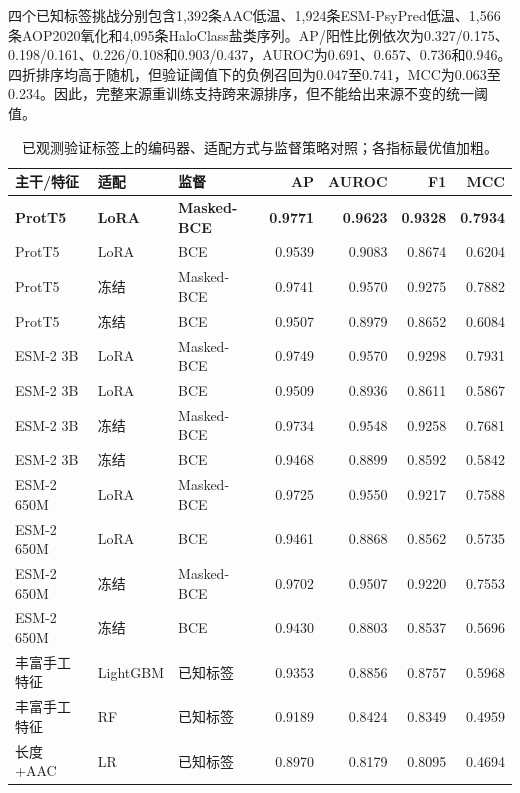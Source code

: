 \documentclass[conference]{IEEEtran}
\begin{document}
四个已知标签挑战分别包含1,392条AAC低温、1,924条ESM-PsyPred低温、1,566条AOP2020氧化和4,095条HaloClass盐类序列。AP/阳性比例依次为0.327/0.175、0.198/0.161、0.226/0.108和0.903/0.437，AUROC为0.691、0.657、0.736和0.946。四折排序均高于随机，但验证阈值下的负例召回为0.047至0.741，MCC为0.063至0.234。因此，完整来源重训练支持跨来源排序，但不能给出来源不变的统一阈值。

\begin{table}[t]
\centering
\caption{已观测验证标签上的编码器、适配方式与监督策略对照；各指标最优值加粗。}
\label{tab:2}
\footnotesize
\setlength{\tabcolsep}{3pt}
\begin{tabularx}{\textwidth}{@{}Xllrrrr@{}}
\toprule
主干/特征 & 适配 & 监督 & AP & AUROC & F1 & MCC \\
\midrule
\textbf{ProtT5} & \textbf{LoRA} & \textbf{Masked-BCE} & \textbf{0.9771} & \textbf{0.9623} & \textbf{0.9328} & \textbf{0.7934} \\
ProtT5 & LoRA & BCE & 0.9539 & 0.9083 & 0.8674 & 0.6204 \\
ProtT5 & 冻结 & Masked-BCE & 0.9741 & 0.9570 & 0.9275 & 0.7882 \\
ProtT5 & 冻结 & BCE & 0.9507 & 0.8979 & 0.8652 & 0.6084 \\
\midrule
ESM-2 3B & LoRA & Masked-BCE & 0.9749 & 0.9570 & 0.9298 & 0.7931 \\
ESM-2 3B & LoRA & BCE & 0.9509 & 0.8936 & 0.8611 & 0.5867 \\
ESM-2 3B & 冻结 & Masked-BCE & 0.9734 & 0.9548 & 0.9258 & 0.7681 \\
ESM-2 3B & 冻结 & BCE & 0.9468 & 0.8899 & 0.8592 & 0.5842 \\
\midrule
ESM-2 650M & LoRA & Masked-BCE & 0.9725 & 0.9550 & 0.9217 & 0.7588 \\
ESM-2 650M & LoRA & BCE & 0.9461 & 0.8868 & 0.8562 & 0.5735 \\
ESM-2 650M & 冻结 & Masked-BCE & 0.9702 & 0.9507 & 0.9220 & 0.7553 \\
ESM-2 650M & 冻结 & BCE & 0.9430 & 0.8803 & 0.8537 & 0.5696 \\
\midrule
丰富手工特征 & LightGBM & 已知标签 & 0.9353 & 0.8856 & 0.8757 & 0.5968 \\
丰富手工特征 & RF & 已知标签 & 0.9189 & 0.8424 & 0.8349 & 0.4959 \\
长度+AAC & LR & 已知标签 & 0.8970 & 0.8179 & 0.8095 & 0.4694 \\
\bottomrule
\end{tabularx}
\end{table}
\end{document}
